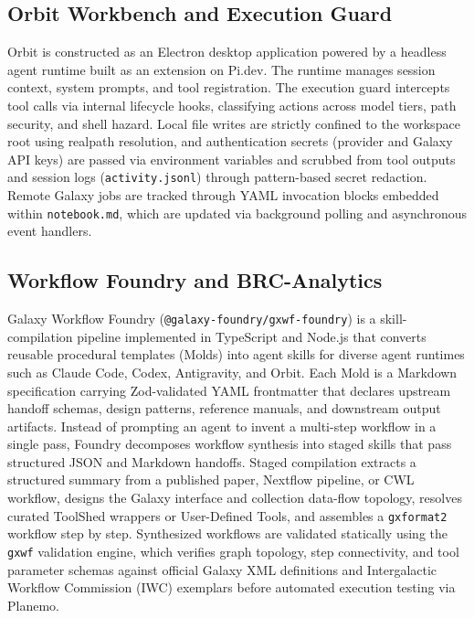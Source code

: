 \documentclass[11pt,letterpaper]{article}
\begin{document}
\subsection*{Orbit Workbench and Execution Guard}
Orbit is constructed as an Electron desktop application powered by a headless agent runtime built as an extension on Pi.dev. The runtime manages session context, system prompts, and tool registration. The execution guard intercepts tool calls via internal lifecycle hooks, classifying actions across model tiers, path security, and shell hazard. Local file writes are strictly confined to the workspace root using realpath resolution, and authentication secrets (provider and Galaxy API keys) are passed via environment variables and scrubbed from tool outputs and session logs (\texttt{activity.jsonl}) through pattern-based secret redaction. Remote Galaxy jobs are tracked through YAML invocation blocks embedded within \texttt{notebook.md}, which are updated via background polling and asynchronous event handlers.

\subsection*{Workflow Foundry and BRC-Analytics}
Galaxy Workflow Foundry (\texttt{@galaxy-foundry/gxwf-foundry}) \cite{foundry2026} is a skill-compilation pipeline implemented in TypeScript and Node.js that converts reusable procedural templates (Molds) into agent skills for diverse agent runtimes such as Claude Code, Codex, Antigravity, and Orbit. Each Mold is a Markdown specification carrying Zod-validated YAML frontmatter that declares upstream handoff schemas, design patterns, reference manuals, and downstream output artifacts. Instead of prompting an agent to invent a multi-step workflow in a single pass, Foundry decomposes workflow synthesis into staged skills that pass structured JSON and Markdown handoffs. Staged compilation extracts a structured summary from a published paper, Nextflow pipeline, or CWL workflow, designs the Galaxy interface and collection data-flow topology, resolves curated ToolShed wrappers or User-Defined Tools, and assembles a \texttt{gxformat2} workflow step by step. Synthesized workflows are validated statically using the \texttt{gxwf} validation engine, which verifies graph topology, step connectivity, and tool parameter schemas against official Galaxy XML definitions and Intergalactic Workflow Commission (IWC) exemplars \cite{iwc2026} before automated execution testing via Planemo.
\end{document}
